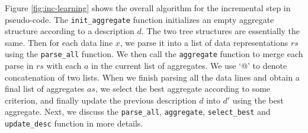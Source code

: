Figure \ref{fig:inc-learning} shows the overall algorithm for the incremental step in
pseudo-code. The {\tt init\_aggregate} function initializes an empty aggregate
structure according to a description $d$. The two tree structures are essentially the
same. Then for each data line $x$, we parse it into a list of data representations $rs$
using the {\tt parse\_all} function. We then call the {\tt aggregate} function to merge
each parse in $rs$ with each $a$ in the current list of aggregates. We use `@' to denote
concatenation of two lists. When we finish
parsing all the data lines and obtain a final list of aggregates $as$, we select
the best aggregate according to some criterion, and finally update the previous description
$d$ into $d'$ using the best aggregate. Next, we discuss the {\tt parse\_all},
{\tt aggregate}, {\tt select\_best} and {\tt update\_desc} function in more details.

